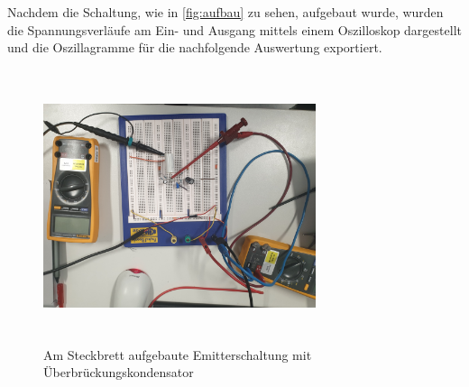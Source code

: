 \documentclass[12pt,english,ngerman]{scrartcl}
\begin{document}
Nachdem die Schaltung, wie in  \autoref{fig:aufbau} zu sehen, aufgebaut
wurde, wurden die Spannungsverläufe am Ein- und Ausgang mittels einem
Oszilloskop dargestellt und die Oszillagramme für die nachfolgende
Auswertung exportiert.

\begin{figure}[H]
    \centering
    \includegraphics[width=8cm, height=8cm,keepaspectratio]{./figures/foto.png}
    \caption{Am Steckbrett aufgebaute Emitterschaltung mit Überbrückungskondensator}
    \label{fig:aufbau}
\end{figure}



\end{document}
